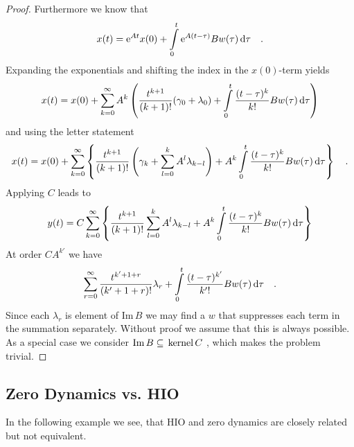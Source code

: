 \begin{proof}
	Furthermore we know that
	\begin{equation}
	x(t) = \text{e}^{At}x(0) + \int\limits_{0}^t \text{e}^{A(t-\tau)} B w(\tau) \, \text{d} \tau 
	\quad .
	\end{equation}
	Expanding the exponentials and shifting the index in the $x(0)$-term yields
	\begin{equation}
	x(t) = x(0) + \sum\limits_{k=0}^\infty A^k \left( 
	\frac{t^{k+1}}{(k+1)!} (\gamma_0+\lambda_0) + \int\limits_0^t \frac{(t-\tau)^k}{k!}
	Bw(\tau) \, \text{d}\tau
	\right)
	\end{equation}
	and using the letter statement
	\begin{equation}
	x(t)=x(0) + \sum\limits_{k=0}^\infty 
	\left\{ \frac{t^{k+1}}{(k+1)!} 
	\left( \gamma_k
	+\sum\limits_{l=0}^k A^l\lambda_{k-l}
	\right) 
	+ A^k \int\limits_0^t \frac{(t-\tau)^k}{k!} Bw(\tau) \, \text{d} \tau
	\right\} \quad .
	\end{equation}
	Applying $C$ leads to
	\begin{equation}
	y(t) =C\sum\limits_{k=0}^\infty  \left\{ 
	\frac{t^{k+1}}{(k+1)!}
	\sum\limits_{l=0}^k A^l \lambda_{k-l} + A^k\int\limits_0^t 
	\frac{(t-\tau)^k}{k!} B w(\tau) \, \text{d} \tau
	\right\}
	\end{equation}
	At order $C A^{k'}$ we have
	\begin{equation}
	\sum\limits_{r=0}^\infty \frac{t^{k'+1+r}}{(k'+1+r)!} \lambda_{r} +
	\int\limits_0^t 
	\frac{(t-\tau)^{k'}}{k'!} B w(\tau) \, \text{d} \tau \quad .
	\end{equation}
	Since each $\lambda_r$ is element of $\text{Im}\,B$ we may find a 
	$w$ that suppresses each term in the summation separately. Without 
	proof we assume that this is always possible.\\
	As a special case we consider $\text{Im}\, B \subseteq  \, \text{kernel}\,C \,\,$, 
	which makes the problem trivial.
\end{proof}
	
\subsection{Zero Dynamics vs. HIO}
In the following example we see, that HIO and zero dynamics are closely 
related but not equivalent.

